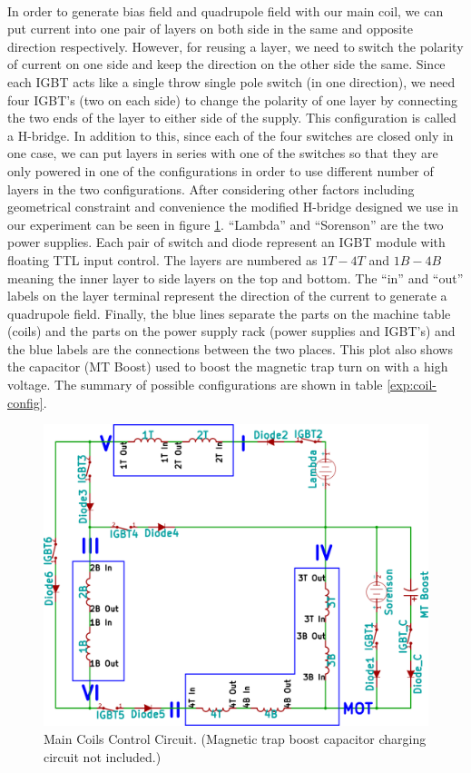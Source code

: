 \\
In order to generate bias field and quadrupole field with our main coil, we can put current into one pair of layers on both side in the same and opposite direction respectively. However, for reusing a layer, we need to switch the polarity of current on one side and keep the direction on the other side the same. Since each IGBT acts like a single throw single pole switch (in one direction), we need four IGBT's (two on each side) to change the polarity of one layer by connecting the two ends of the layer to either side of the supply. This configuration is called a H-bridge. In addition to this, since each of the four switches are closed only in one case, we can put layers in series with one of the switches so that they are only powered in one of the configurations in order to use different number of layers in the two configurations. After considering other factors including geometrical constraint and convenience the modified H-bridge designed we use in our experiment can be seen in figure \ref{exp:coil-control}. ``Lambda'' and ``Sorenson'' are the two power supplies. Each pair of switch and diode represent an IGBT module with floating TTL input control. The layers are numbered as $1T-4T$ and $1B-4B$ meaning the inner layer to side layers on the top and bottom. The ``in'' and ``out'' labels on the layer terminal represent the direction of the current to generate a quadrupole field. Finally, the blue lines separate the parts on the machine table (coils) and the parts on the power supply rack (power supplies and IGBT's) and the blue labels are the connections between the two places. This plot also shows the capacitor (MT Boost) used to boost the magnetic trap turn on with a high voltage. The summary of possible configurations are shown in table \ref{exp:coil-config}.
\begin{figure}
  \begin{center}
    \includegraphics[width=15cm]{coil.png}
  \end{center}
  \caption{Main Coils Control Circuit. (Magnetic trap boost capacitor charging circuit not included.)}
  \label{exp:coil-control}
\end{figure}
